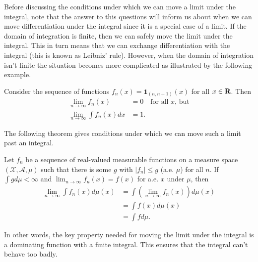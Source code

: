 \documentclass[twoside]{article}
\begin{document}
Before discussing the conditions under which we can move a limit under the
integral, note that the answer to this questions will inform us about when we
can move differentiation under the integral since it is a special case of a
limit.  If the domain of integration is finite, then we can safely move the
limit under the integral.  This in turn means that we can exchange
differentiation with the integral (this is known as Leibniz' rule).  However,
when the domain of integration isn't finite the situation becomes more
complicated as illustrated by the following example.

\begin{example}
Consider the sequence of functions $f_n(x) = \mathbf{1}_{(n, n+1)}(x)$ for all
$x \in \mathbf{R}$.  Then
\begin{align*}
  \lim_{n \rightarrow \infty} f_n(x) &= 0 \quad \text{for all $x$, but}\\
  \lim_{n \rightarrow \infty} \int f_n(x) dx &= 1.
\end{align*}
\end{example}

The following theorem gives conditions under which we can move such a limit
past an integral.

\begin{theorem}\citep[Theorem 2.5, p.~29]{keener}
  Let ${f_n}$ be a sequence of real-valued measurable functions on a
  measure space $(\mathcal X, \mathcal A, \mu)$ such that there is some
  $g$ with $|f_n| \le g$ (a.e. $\mu$) for all $n$.  If $\int g d\mu < \infty$
  and $\lim_{n \rightarrow \infty} f_n(x) = f(x)$ for a.e. $x$ under $\mu$,
  then
  \begin{align*}
    \lim_{n \rightarrow \infty} \int f_n(x) d\mu(x) &= \int
      \left(\lim_{n \rightarrow \infty} f_n(x) \right) d\mu(x) \\
       &= \int f(x) d\mu(x) \\
       &= \int f d\mu.
  \end{align*} 
\end{theorem}

In other words, the key property needed for moving the limit under the integral
is a dominating function with a finite integral.  This ensures that the integral
can't behave too badly.
\end{document}
